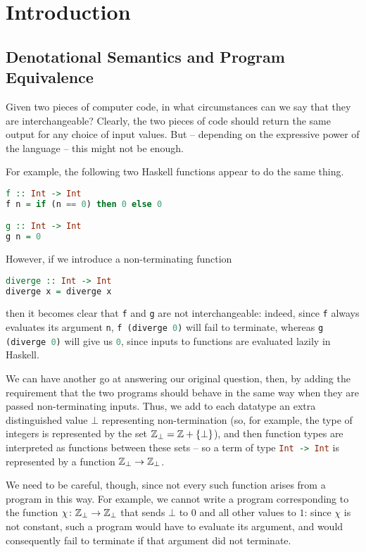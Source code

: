 \chapter{Introduction}

\section{Denotational Semantics and Program Equivalence}

Given two pieces of computer code, in what circumstances can we say that they are interchangeable?
Clearly, the two pieces of code should return the same output for any choice of input values. 
But -- depending on the expressive power of the language -- this might not be enough.

For example, the following two Haskell functions appear to do the same thing.

\begin{lstlisting}[language=haskell]
f :: Int -> Int
f n = if (n == 0) then 0 else 0

g :: Int -> Int
g n = 0
\end{lstlisting}

However, if we introduce a non-terminating function
\begin{lstlisting}[language=haskell]
diverge :: Int -> Int
diverge x = diverge x
\end{lstlisting}
then it becomes clear that \lstinline[language=haskell]{f} and \lstinline[language=haskell]{g} are not interchangeable: indeed, since \lstinline[language=haskell]{f} always evaluates its argument \lstinline[language=haskell]{n}, \lstinline[language=haskell]{f (diverge 0)} will fail to terminate, whereas \lstinline[language=haskell]{g (diverge 0)} will give us \lstinline[language=haskell]{0}, since inputs to functions are evaluated lazily in Haskell.

We can have another go at answering our original question, then, by adding the requirement that the two programs should behave in the same way when they are passed non-terminating inputs.
Thus, we add to each datatype an extra distinguished value $\bot$ representing non-termination (so, for example, the type of integers is represented by the set $\mathbb{Z}_\bot = \mathbb{Z} + \{\bot\}$), and then function types are interpreted as functions between these sets -- so a term of type \lstinline[language=haskell]{Int -> Int} is represented by a function $\mathbb{Z}_\bot \to \mathbb{Z}_\bot$.

We need to be careful, though, since not every such function arises from a program in this way.
For example, we cannot write a program corresponding to the function $\chi\colon\mathbb{Z}_\bot \to \mathbb{Z}_\bot$ that sends $\bot$ to $0$ and all other values to $1$: since $\chi$ is not constant, such a program would have to evaluate its argument, and would consequently fail to terminate if that argument did not terminate.

